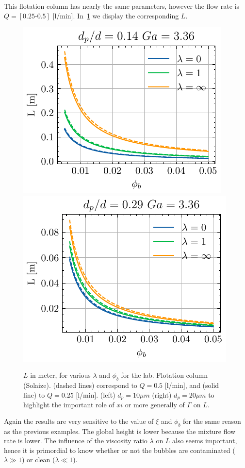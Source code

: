 This flotation column has nearly the same parameters, however the flow rate is $Q= [0.25\text{-} 0.5]$ [l/min]. 
In~\ref{fig:height_two} we display the corresponding $L$. 

\begin{figure}[h!]
    \centering
    \includegraphics[height=0.40\textwidth]{image/flotation/examples/case_two.pdf}
    \includegraphics[height=0.40\textwidth]{image/flotation/examples/case_two_xi2.pdf}
    \caption{
    $L$ in meter, for various $\lambda$ and $\phi_b$ for the lab. Flotation column (Solaize). 
    (dashed lines) correspond to $Q=0.5$ [l/min], and (solid line) to $Q = 0.25$ [l/min].
    (left) $d_p = 10\mu m$
    (right) $d_p = 20\mu m$ to highlight the important role of $xi$ or more generally of $\Gamma$ on $L$. }
    \label{fig:height_two}
\end{figure}
Again the results are very sensitive to the value of $\xi$ and $\phi_b$ for the same reason as the previous examples. 
The global height is lower because the mixture flow rate is lower. 
The influence of the viscosity ratio $\lambda$ on $L$ also seems important, hence it is primordial to know whether or not the bubbles are contaminated ($\lambda \gg 1$) or clean ($\lambda \ll 1$).

\vspace{0.5cm}
\noindent
{}
    

